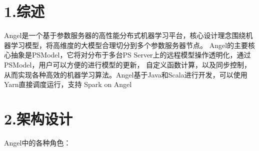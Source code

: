 \documentclass{article}
\begin{document}
\mdxtitleblockstart{}
\mdxauthorstart{}
\mdxauthorend\mdtitleauthorrunning{}{}\mdxtitleblockend%

\section{1.\hspace*{0.5em}综述}\label{section}%

\noindent{}Angel是一个基于参数服务器的高性能分布式机器学习平台，核心设计理念围绕机器学习模型，将高维度的大模型合理切分到多个参数服务器节点。
Angel的主要核心抽象是PSModel，它将对分布于多台PS Server上的远程模型操作透明化，通过PSModel，用户可以方便的进行模型的更新，
自定义函数计算，以及同步控制，从而实现各种高效的机器学习算法。Angel基于Java和Scala进行开发，可以使用Yarn直接调度运行，支持
Spark on Angel%

\section{2.\hspace*{0.5em}架构设计}\label{section}%

\noindent{}Angel中的各种角色：%
\end{document}
